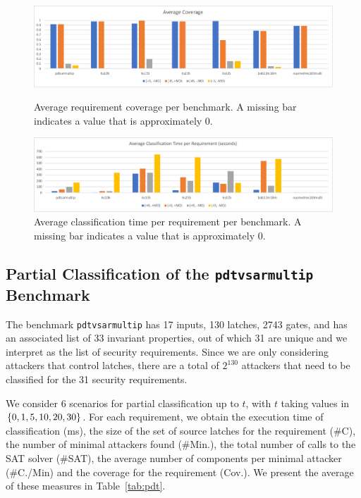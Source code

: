 {\begin{figure}[!t]
\centering
\includegraphics[width=\textwidth]{AverageCoverage}
\caption{Average requirement coverage per benchmark. A missing bar indicates a value that is approximately 0.}
\label{fig:AverageCoverage}
\vspace{0.5cm}
\includegraphics[width=\textwidth]{AverageExecutionTime}
\caption{Average classification time per requirement per benchmark. A missing bar indicates a value that is approximately 0. }
\label{fig:AverageExecTime}
\end{figure}

\subsection{Partial Classification of the \texttt{pdtvsarmultip} Benchmark}
The benchmark \texttt{pdtvsarmultip} has 17 inputs, %
130 latches, %
2743 gates, %
and has an associated list of 33 invariant properties, out of which 31 are unique and we interpret as the list of security requirements. 
Since we are only considering attackers that control latches, there are a total of $2^{130}$ attackers that need to be classified for the 31 security requirements.

We consider 6 scenarios for partial classification up to $t$, with $t$ taking values in $\left\{0,1,5,10,20,30\right\}$. For each requirement, we obtain the execution time of classification (ms), the size of the set of source latches for the requirement (\#C), the number of minimal attackers found (\#Min.), the total number of calls to the SAT solver (\#SAT), the average number of components per minimal attacker (\#C./Min) and the coverage for the requirement (Cov.). We present the average of these measures in Table~\ref{tab:pdt}. 

}
